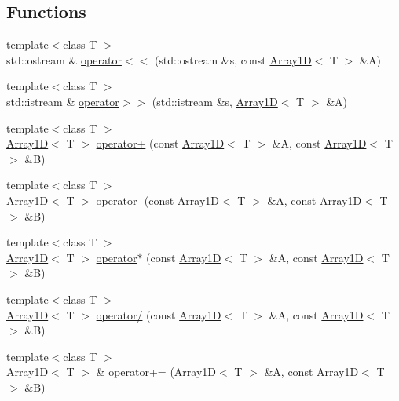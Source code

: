 \subsection*{Functions}
\begin{DoxyCompactItemize}
\item 
{\footnotesize template$<$class T $>$ }\\std\+::ostream \& \hyperlink{namespaceTNT_ac0bffe1c89cc792a28f37d17afc2ce67}{operator$<$$<$} (std\+::ostream \&s, const \hyperlink{classTNT_1_1Array1D}{Array1D}$<$ T $>$ \&A)
\item 
{\footnotesize template$<$class T $>$ }\\std\+::istream \& \hyperlink{namespaceTNT_ac85e172cd409433504bb3a8a6df3ac9f}{operator$>$$>$} (std\+::istream \&s, \hyperlink{classTNT_1_1Array1D}{Array1D}$<$ T $>$ \&A)
\item 
{\footnotesize template$<$class T $>$ }\\\hyperlink{classTNT_1_1Array1D}{Array1D}$<$ T $>$ \hyperlink{namespaceTNT_a25681ebc742c0ffb1fc09d8988a7314c}{operator+} (const \hyperlink{classTNT_1_1Array1D}{Array1D}$<$ T $>$ \&A, const \hyperlink{classTNT_1_1Array1D}{Array1D}$<$ T $>$ \&B)
\item 
{\footnotesize template$<$class T $>$ }\\\hyperlink{classTNT_1_1Array1D}{Array1D}$<$ T $>$ \hyperlink{namespaceTNT_a79ec326e12f3292bf034035d52c98a08}{operator-\/} (const \hyperlink{classTNT_1_1Array1D}{Array1D}$<$ T $>$ \&A, const \hyperlink{classTNT_1_1Array1D}{Array1D}$<$ T $>$ \&B)
\item 
{\footnotesize template$<$class T $>$ }\\\hyperlink{classTNT_1_1Array1D}{Array1D}$<$ T $>$ \hyperlink{namespaceTNT_a631669334b75ebb846723bf079fd2c8d}{operator$\ast$} (const \hyperlink{classTNT_1_1Array1D}{Array1D}$<$ T $>$ \&A, const \hyperlink{classTNT_1_1Array1D}{Array1D}$<$ T $>$ \&B)
\item 
{\footnotesize template$<$class T $>$ }\\\hyperlink{classTNT_1_1Array1D}{Array1D}$<$ T $>$ \hyperlink{namespaceTNT_aba09c30731e80420cd42fff00f72b18b}{operator/} (const \hyperlink{classTNT_1_1Array1D}{Array1D}$<$ T $>$ \&A, const \hyperlink{classTNT_1_1Array1D}{Array1D}$<$ T $>$ \&B)
\item 
{\footnotesize template$<$class T $>$ }\\\hyperlink{classTNT_1_1Array1D}{Array1D}$<$ T $>$ \& \hyperlink{namespaceTNT_a7f7491e4135cc219739a541eead94bb5}{operator+=} (\hyperlink{classTNT_1_1Array1D}{Array1D}$<$ T $>$ \&A, const \hyperlink{classTNT_1_1Array1D}{Array1D}$<$ T $>$ \&B)

\end{DoxyCompactItemize}
